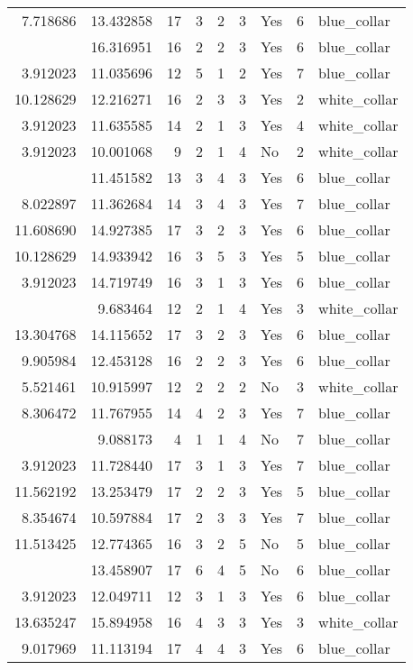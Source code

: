\documentclass[
]{article}
\begin{document}
\begin{longtable}[t]{rrrrrllrl}
7.718686 & 13.432858 & 17 & 3 & 2 & 3 & Yes & 6 & blue\_collar\\
\addlinespace
15.649699 & 16.316951 & 16 & 2 & 2 & 3 & Yes & 6 & blue\_collar\\
3.912023 & 11.035696 & 12 & 5 & 1 & 2 & Yes & 7 & blue\_collar\\
10.128629 & 12.216271 & 16 & 2 & 3 & 3 & Yes & 2 & white\_collar\\
3.912023 & 11.635585 & 14 & 2 & 1 & 3 & Yes & 4 & white\_collar\\
3.912023 & 10.001068 & 9 & 2 & 1 & 4 & No & 2 & white\_collar\\
\addlinespace
10.310618 & 11.451582 & 13 & 3 & 4 & 3 & Yes & 6 & blue\_collar\\
8.022897 & 11.362684 & 14 & 3 & 4 & 3 & Yes & 7 & blue\_collar\\
11.608690 & 14.927385 & 17 & 3 & 2 & 3 & Yes & 6 & blue\_collar\\
10.128629 & 14.933942 & 16 & 3 & 5 & 3 & Yes & 5 & blue\_collar\\
3.912023 & 14.719749 & 16 & 3 & 1 & 3 & Yes & 6 & blue\_collar\\
\addlinespace
3.912023 & 9.683464 & 12 & 2 & 1 & 4 & Yes & 3 & white\_collar\\
13.304768 & 14.115652 & 17 & 3 & 2 & 3 & Yes & 6 & blue\_collar\\
9.905984 & 12.453128 & 16 & 2 & 2 & 3 & Yes & 6 & blue\_collar\\
5.521461 & 10.915997 & 12 & 2 & 2 & 2 & No & 3 & white\_collar\\
8.306472 & 11.767955 & 14 & 4 & 2 & 3 & Yes & 7 & blue\_collar\\
\addlinespace
3.912023 & 9.088173 & 4 & 1 & 1 & 4 & No & 7 & blue\_collar\\
3.912023 & 11.728440 & 17 & 3 & 1 & 3 & Yes & 7 & blue\_collar\\
11.562192 & 13.253479 & 17 & 2 & 2 & 3 & Yes & 5 & blue\_collar\\
8.354674 & 10.597884 & 17 & 2 & 3 & 3 & Yes & 7 & blue\_collar\\
11.513425 & 12.774365 & 16 & 3 & 2 & 5 & No & 5 & blue\_collar\\
\addlinespace
9.800901 & 13.458907 & 17 & 6 & 4 & 5 & No & 6 & blue\_collar\\
3.912023 & 12.049711 & 12 & 3 & 1 & 3 & Yes & 6 & blue\_collar\\
13.635247 & 15.894958 & 16 & 4 & 3 & 3 & Yes & 3 & white\_collar\\
9.017969 & 11.113194 & 17 & 4 & 4 & 3 & Yes & 6 & blue\_collar\\

\end{longtable}
\end{document}
